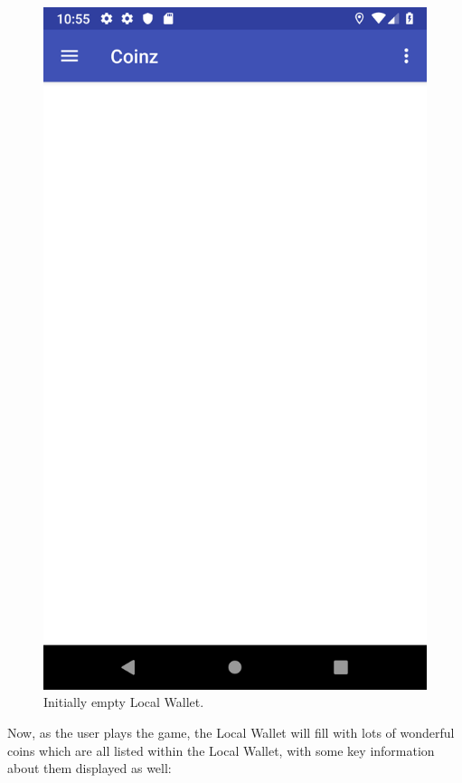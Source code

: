 \documentclass[11pt,a4paper,notitlepage]{article}
\begin{document}
\begin{figure}[H]
\begin{minipage}[t]{0.48\textwidth}
        \includegraphics[scale=0.2]{screenshots/local-wallet/empty-local-wallet.png}
        \caption{Initially empty Local Wallet.}
    \end{minipage}
\end{figure}

    Now, as the user plays the game, the Local Wallet will fill with lots of wonderful coins which are all listed within the Local Wallet, with some key information about them displayed as well:
\end{document}
